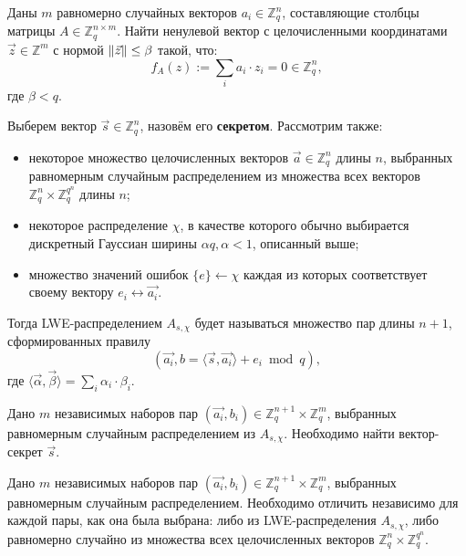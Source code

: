 \begin{definition}
Даны $m$ равномерно случайных векторов $a_i\in\mathbb{Z}_q^n$, составляющие столбцы матрицы $A\in\mathbb{Z}_q^{n\times m}$. Найти ненулевой вектор с целочисленными координатами $\vec{z}\in\mathbb{Z}^m$ с нормой $\norm{\vec{z}}\leq\beta$ такой, что:
\begin{equation}
    f_A(z):=\sum_{i} a_i \cdot z_i=0\in\mathbb{Z}_q^n,
\end{equation}
где $\beta < q$.
\end{definition}

\begin{definition}
Выберем вектор $\vec{s}\in\mathbb{Z}_q^n$, назовём его \textbf{секретом}. Рассмотрим также:
\begin{itemize}
    \item некоторое множество целочисленных векторов $\vec{a}\in\mathbb{Z}_q^n$ длины $n$, выбранных равномерным случайным распределением из множества всех векторов $\mathbb{Z}_q^n\times\mathbb{Z}_q^{q^n}$ длины $n$;
    \item некоторое распределение $\chi$, в качестве которого обычно выбирается дискретный Гауссиан ширины $\alpha q, \alpha < 1$, описанный выше;
    \item множество значений ошибок $\{e\} \leftarrow \chi$ каждая из которых соответствует своему вектору $e_i \longleftrightarrow \vec{a_i}$.
\end{itemize}
Тогда LWE-распределением $A_{s,\chi}$ будет называться множество пар длины $n+1$, сформированных правилу
\begin{equation}
    (\vec{a_i},b = \langle \vec{s}, \vec{a_i}\rangle + e_i \bmod q),
\end{equation}
где $\langle\vec{\alpha},\vec{\beta}\rangle = \sum_{i}\alpha_i\cdot\beta_i$.
\end{definition}

\begin{definition}
Дано $m$ независимых наборов пар $(\vec{a_i}, b_i) \in \mathbb{Z}_q^{n+1} \times \mathbb{Z}_q^m$, 
выбранных равномерным случайным распределением из $A_{s,\chi}$. Необходимо найти
вектор-секрет $\vec{s}$.
\end{definition}

\begin{definition}
Дано $m$ независимых наборов пар $(\vec{a_i}, b_i) \in \mathbb{Z}_q^{n+1} \times \mathbb{Z}_q^m$, выбранных равномерным случайным распределением. Необходимо отличить независимо для каждой пары, как она была выбрана: либо из LWE-распределения $A_{s,\chi}$, либо равномерно случайно из множества всех целочисленных векторов $\mathbb{Z}_q^n\times\mathbb{Z}_q^{q^n}$.
\end{definition}

